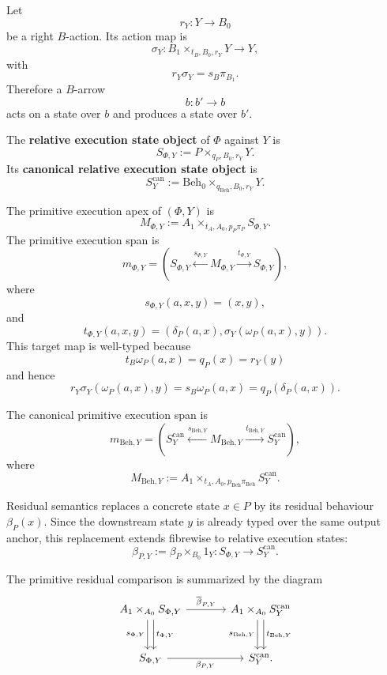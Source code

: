 Let
\[
  r_Y:Y\to B_0
\]
be a right \(B\)-action.  Its action map is
\[
  \sigma_Y:
  B_1\times_{t_B,B_0,r_Y}Y\longrightarrow Y,
\]
with
\[
  r_Y\sigma_Y=s_B\pi_{B_1}.
\]
Therefore a \(B\)-arrow
\[
  b:b'\to b
\]
acts on a state over \(b\) and produces a state over \(b'\).

\begin{definition}
\label{def:relative-execution-state-object}
The \textbf{relative execution state object} of \(\Phi\) against \(Y\) is
\[
  S_{\Phi,Y}
  :=
  P\times_{q_P,B_0,r_Y}Y.
\]
Its \textbf{canonical relative execution state object} is
\[
  S^{\mathrm{can}}_Y
  :=
  \mathrm{Beh}_0\times_{q_{\mathrm{Beh}},B_0,r_Y}Y.
\]
\end{definition}

The primitive execution apex of \((\Phi,Y)\) is
\[
  M_{\Phi,Y}
  :=
  A_1\times_{t_A,A_0,p_P\pi_P}S_{\Phi,Y}.
\]
The primitive execution span is
\[
  m_{\Phi,Y}
  =
  \left(
  S_{\Phi,Y}
  \xleftarrow{s_{\Phi,Y}}
  M_{\Phi,Y}
  \xrightarrow{t_{\Phi,Y}}
  S_{\Phi,Y}
  \right),
\]
where
\[
  s_{\Phi,Y}(a,x,y)=(x,y),
\]
and
\[
  t_{\Phi,Y}(a,x,y)
  =
  \left(
    \delta_P(a,x),
    \sigma_Y(\omega_P(a,x),y)
  \right).
\]
This target map is well-typed because
\[
  t_B\omega_P(a,x)=q_P(x)=r_Y(y)
\]
and hence
\[
  r_Y\sigma_Y(\omega_P(a,x),y)
  =
  s_B\omega_P(a,x)
  =
  q_P(\delta_P(a,x)).
\]

The canonical primitive execution span is
\[
  m_{\mathrm{Beh},Y}
  =
  \left(
  S^{\mathrm{can}}_Y
  \xleftarrow{s_{\mathrm{Beh},Y}}
  M_{\mathrm{Beh},Y}
  \xrightarrow{t_{\mathrm{Beh},Y}}
  S^{\mathrm{can}}_Y
  \right),
\]
where
\[
  M_{\mathrm{Beh},Y}
  :=
  A_1\times_{t_A,A_0,p_{\mathrm{Beh}}\pi_{\mathrm{Beh}}}
  S^{\mathrm{can}}_Y.
\]

Residual semantics replaces a concrete state \(x\in P\) by its residual
behaviour \(\beta_P(x)\).  Since the downstream state \(y\) is already typed
over the same output anchor, this replacement extends fibrewise to relative
execution states:
\[
  \beta_{P,Y}
  :=
  \beta_P\times_{B_0}1_Y:
  S_{\Phi,Y}
  \longrightarrow
  S^{\mathrm{can}}_Y.
\]

The primitive residual comparison is summarized by the diagram
\[
\begin{tikzcd}[column sep=large,row sep=large]
A_1\times_{A_0}S_{\Phi,Y}
  \arrow[r, "\overline{\beta}_{P,Y}"]
  \arrow[d, shift right=.65ex, "s_{\Phi,Y}"']
  \arrow[d, shift left=.65ex, "t_{\Phi,Y}"]
&
A_1\times_{A_0}S^{\mathrm{can}}_Y
  \arrow[d, shift right=.65ex, "s_{\mathrm{Beh},Y}"']
  \arrow[d, shift left=.65ex, "t_{\mathrm{Beh},Y}"]
\\
S_{\Phi,Y}
  \arrow[r, "\beta_{P,Y}"']
&
S^{\mathrm{can}}_Y .
\end{tikzcd}
\]

